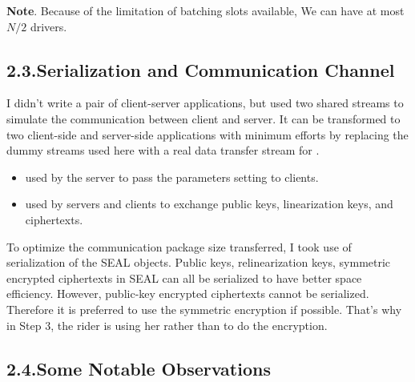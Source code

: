 \documentclass[12pt]{article}
\begin{document}
\noindent{}\textbf{Note}.
Because of the limitation of batching slots available, We can have at most $N/2$ drivers.%

\subsection{2.3.\hspace*{0.5em}Serialization and Communication Channel}\label{sec-serialization-and-communication-channel}%

\noindent{}I didn't write a pair of client-server applications, but used two shared streams to simulate the communication between client and server. It can be transformed to two client-side and server-side applications with minimum efforts by replacing the dummy streams used here with a real data transfer stream for .%

\begin{itemize}[noitemsep,topsep=\mdcompacttopsep]%

\item{} used by the server to pass the parameters setting to clients.%

\item{} used by servers and clients to exchange public keys, linearization keys, and ciphertexts.%
\end{itemize}%

\noindent{}To optimize the communication package size transferred, I took use of serialization of the SEAL objects. Public keys, relinearization keys, symmetric encrypted ciphertexts in SEAL can all be serialized to have better space efficiency. However, public-key encrypted ciphertexts cannot be serialized. Therefore it is preferred to use the symmetric encryption if possible. That's why in Step 3, the rider is using her  rather than  to do the encryption.%

\subsection{2.4.\hspace*{0.5em}Some Notable Observations}\label{sec-some-notable-observations}%
\end{document}
